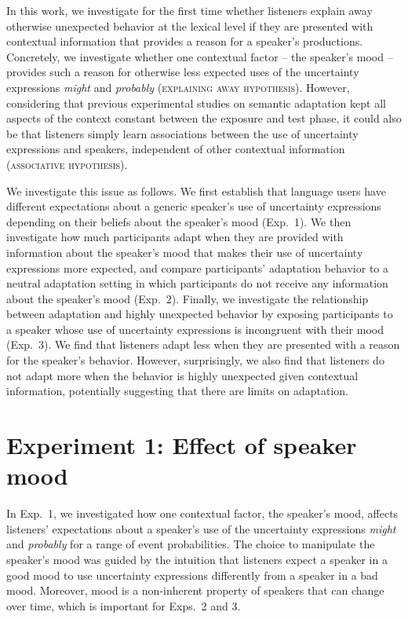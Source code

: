 In this work, we investigate for the first time whether listeners explain away otherwise unexpected behavior at the lexical level if they are presented with contextual information that provides a reason for a speaker's productions. Concretely, we investigate whether one contextual factor  -- the speaker's mood -- provides such a reason for otherwise less expected uses of the uncertainty expressions \textit{might} and \textit{probably}  (\textsc{explaining away hypothesis}). However, considering that previous experimental studies on semantic adaptation \cite{Yildirim2016,Schuster2019} kept all aspects of the context constant between the exposure and test phase, it could also be that listeners simply learn associations between the use of uncertainty expressions and speakers, independent of other contextual information (\textsc{associative hypothesis}).

We investigate this issue as follows. We first establish that language users have different expectations about a generic speaker's use of uncertainty expressions depending on their beliefs about the speaker's mood (Exp.~1). We then investigate how much participants adapt when they are provided with information about the speaker's mood that makes their use of uncertainty expressions more expected, and compare participants' adaptation behavior to a neutral adaptation setting in which participants do not receive any information about the speaker's mood (Exp.~2). Finally, we investigate the relationship between adaptation and highly unexpected behavior by exposing participants to a speaker whose use of uncertainty expressions is incongruent with their mood (Exp.~3). We find that listeners adapt less when they are presented with a reason for the speaker's behavior. However, surprisingly, we also find that listeners do not adapt more when the behavior is highly unexpected given contextual information, potentially suggesting that there are limits on adaptation.

\section{Experiment 1: Effect of speaker mood}

In Exp.~1, we investigated how one contextual factor, the speaker's mood, affects listeners' expectations about a speaker's use of the uncertainty expressions \textit{might} and \textit{probably} for a range of event probabilities. The choice to manipulate the speaker's mood was guided by the intuition that listeners expect a speaker in a good mood to use uncertainty expressions differently from a speaker in a bad mood. Moreover, mood is a non-inherent property of speakers that can change over time, which is important for Exps.~2 and 3. 


